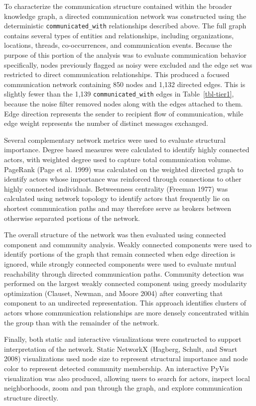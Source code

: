 \documentclass[
  letterpaper,
  DIV=11,
  numbers=noendperiod]{scrartcl}
\begin{document}
To characterize the communication structure contained within the broader
knowledge graph, a directed communication network was constructed using
the deterministic \texttt{communicated\_with} relationships described
above. The full graph contains several types of entities and
relationships, including organizations, locations, threads,
co-occurrences, and communication events. Because the purpose of this
portion of the analysis was to evaluate communication behavior
specifically, nodes previously flagged as noisy were excluded and the
edge set was restricted to direct communication relationships. This
produced a focused communication network containing 850 nodes and 1,132
directed edges. This is slightly fewer than the 1,139
\texttt{communicated\_with} edges in Table~\ref{tbl-tier1}, because the
noise filter removed nodes along with the edges attached to them. Edge
direction represents the sender to recipient flow of communication,
while edge weight represents the number of distinct messages exchanged.

Several complementary network metrics were used to evaluate structural
importance. Degree based measures were calculated to identify highly
connected actors, with weighted degree used to capture total
communication volume. PageRank (Page et al. 1999) was calculated on the
weighted directed graph to identify actors whose importance was
reinforced through connections to other highly connected individuals.
Betweenness centrality (Freeman 1977) was calculated using network
topology to identify actors that frequently lie on shortest
communication paths and may therefore serve as brokers between otherwise
separated portions of the network.

The overall structure of the network was then evaluated using connected
component and community analysis. Weakly connected components were used
to identify portions of the graph that remain connected when edge
direction is ignored, while strongly connected components were used to
evaluate mutual reachability through directed communication paths.
Community detection was performed on the largest weakly connected
component using greedy modularity optimization (Clauset, Newman, and
Moore 2004) after converting that component to an undirected
representation. This approach identifies clusters of actors whose
communication relationships are more densely concentrated within the
group than with the remainder of the network.

Finally, both static and interactive visualizations were constructed to
support interpretation of the network. Static NetworkX (Hagberg, Schult,
and Swart 2008) visualizations used node size to represent structural
importance and node color to represent detected community membership. An
interactive PyVis visualization was also produced, allowing users to
search for actors, inspect local neighborhoods, zoom and pan through the
graph, and explore communication structure directly.
\end{document}
